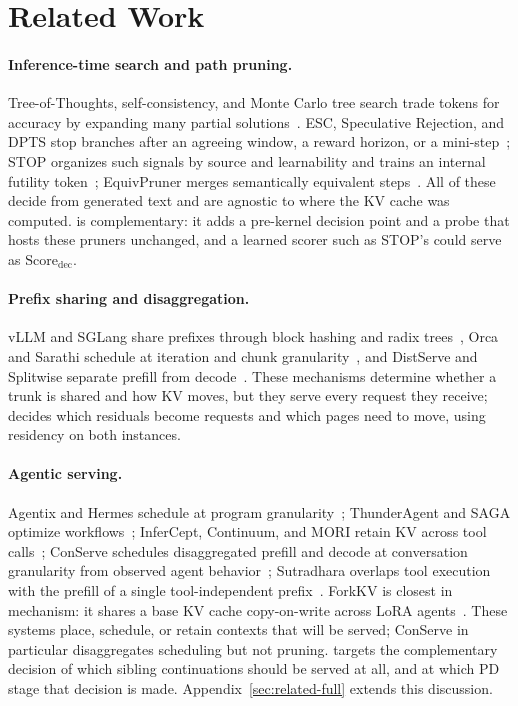 \section{Related Work}
\label{sec:related}

\paragraph{Inference-time search and path pruning.}
Tree-of-Thoughts, self-consistency, and Monte Carlo tree search trade tokens for accuracy by expanding many partial solutions~\cite{tot,selfconsistency,mctsllm,cot}.
ESC, Speculative Rejection, and DPTS stop branches after an agreeing window, a reward horizon, or a mini-step~\cite{esc,specrej,dpts}; STOP organizes such signals by source and learnability and trains an internal futility token~\cite{stoploss}; EquivPruner merges semantically equivalent steps~\cite{equivpruner}.
All of these decide from generated text and are agnostic to where the KV cache was computed.
\sys is complementary: it adds a pre-kernel decision point and a probe that hosts these pruners unchanged, and a learned scorer such as STOP's could serve as $\mathrm{Score}_{\mathrm{dec}}$.

\paragraph{Prefix sharing and disaggregation.}
vLLM and SGLang share prefixes through block hashing and radix trees~\cite{vllm,sglang}, Orca and Sarathi schedule at iteration and chunk granularity~\cite{orca,sarathi}, and DistServe and Splitwise separate prefill from decode~\cite{distserve,splitwise}.
These mechanisms determine whether a trunk is shared and how KV moves, but they serve every request they receive; \sys decides which residuals become requests and which pages need to move, using residency on both instances.

\paragraph{Agentic serving.}
Agentix and Hermes schedule at program granularity~\cite{autellix,hermes}; ThunderAgent and SAGA optimize workflows~\cite{thunderagent,saga}; InferCept, Continuum, and MORI retain KV across tool calls~\cite{infercept,continuum,mori}; ConServe schedules disaggregated prefill and decode at conversation granularity from observed agent behavior~\cite{conserve}; Sutradhara overlaps tool execution with the prefill of a single tool-independent prefix~\cite{sutradhara}.
ForkKV is closest in mechanism: it shares a base KV cache copy-on-write across LoRA agents~\cite{forkkv}.
These systems place, schedule, or retain contexts that will be served; ConServe in particular disaggregates scheduling but not pruning.
\sys targets the complementary decision of which sibling continuations should be served at all, and at which PD stage that decision is made.
Appendix~\ref{sec:related-full} extends this discussion.
